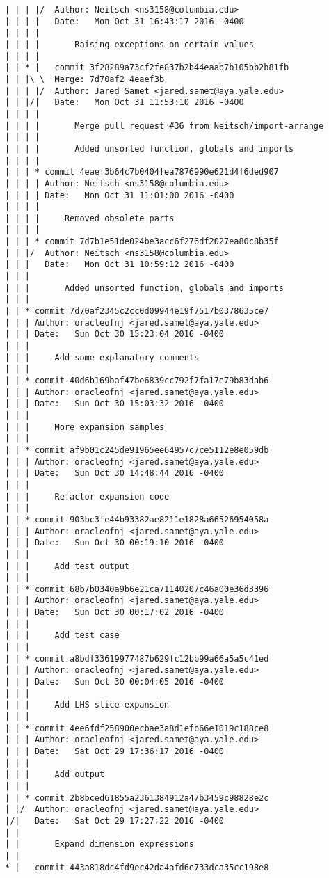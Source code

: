 \begin{lstlisting}
| | | |/  Author: Neitsch <ns3158@columbia.edu>
| | | |   Date:   Mon Oct 31 16:43:17 2016 -0400
| | | |   
| | | |       Raising exceptions on certain values
| | | |       
| | * |   commit 3f28289a73cf2fe837b2b44eaab7b105bb2b81fb
| | |\ \  Merge: 7d70af2 4eaef3b
| | | |/  Author: Jared Samet <jared.samet@aya.yale.edu>
| | |/|   Date:   Mon Oct 31 11:53:10 2016 -0400
| | | |   
| | | |       Merge pull request #36 from Neitsch/import-arrange
| | | |       
| | | |       Added unsorted function, globals and imports
| | | |     
| | | * commit 4eaef3b64c7b0404fea7876990e621d4f6ded907
| | | | Author: Neitsch <ns3158@columbia.edu>
| | | | Date:   Mon Oct 31 11:01:00 2016 -0400
| | | | 
| | | |     Removed obsolete parts
| | | |     
| | | * commit 7d7b1e51de024be3acc6f276df2027ea80c8b35f
| | |/  Author: Neitsch <ns3158@columbia.edu>
| | |   Date:   Mon Oct 31 10:59:12 2016 -0400
| | |   
| | |       Added unsorted function, globals and imports
| | |    
| | * commit 7d70af2345c2cc0d09944e19f7517b0378635ce7
| | | Author: oracleofnj <jared.samet@aya.yale.edu>
| | | Date:   Sun Oct 30 15:23:04 2016 -0400
| | | 
| | |     Add some explanatory comments
| | |    
| | * commit 40d6b169baf47be6839cc792f7fa17e79b83dab6
| | | Author: oracleofnj <jared.samet@aya.yale.edu>
| | | Date:   Sun Oct 30 15:03:32 2016 -0400
| | | 
| | |     More expansion samples
| | |    
| | * commit af9b01c245de91965ee64957c7ce5112e8e059db
| | | Author: oracleofnj <jared.samet@aya.yale.edu>
| | | Date:   Sun Oct 30 14:48:44 2016 -0400
| | | 
| | |     Refactor expansion code
| | |    
| | * commit 903bc3fe44b93382ae8211e1828a66526954058a
| | | Author: oracleofnj <jared.samet@aya.yale.edu>
| | | Date:   Sun Oct 30 00:19:10 2016 -0400
| | | 
| | |     Add test output
| | |    
| | * commit 68b7b0340a9b6e21ca71140207c46a00e36d3396
| | | Author: oracleofnj <jared.samet@aya.yale.edu>
| | | Date:   Sun Oct 30 00:17:02 2016 -0400
| | | 
| | |     Add test case
| | |    
| | * commit a8bdf33619977487b629fc12bb99a66a5a5c41ed
| | | Author: oracleofnj <jared.samet@aya.yale.edu>
| | | Date:   Sun Oct 30 00:04:05 2016 -0400
| | | 
| | |     Add LHS slice expansion
| | |    
| | * commit 4ee6fdf258900ecbae3a8d1efb66e1019c188ce8
| | | Author: oracleofnj <jared.samet@aya.yale.edu>
| | | Date:   Sat Oct 29 17:36:17 2016 -0400
| | | 
| | |     Add output
| | |    
| | * commit 2b8bced61855a2361384912a47b3459c98828e2c
| |/  Author: oracleofnj <jared.samet@aya.yale.edu>
|/|   Date:   Sat Oct 29 17:27:22 2016 -0400
| |   
| |       Expand dimension expressions
| |     
* |   commit 443a818dc4fd9ec42da4afd6e733dca35cc198e8

\end{lstlisting}
